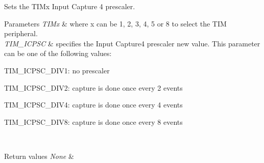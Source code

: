 Sets the T\+I\+Mx Input Capture 4 prescaler. 


\begin{DoxyParams}{Parameters}
{\em T\+I\+Mx} & where x can be 1, 2, 3, 4, 5 or 8 to select the T\+IM peripheral. \\
\hline
{\em T\+I\+M\+\_\+\+I\+C\+P\+SC} & specifies the Input Capture4 prescaler new value. This parameter can be one of the following values\+: \begin{DoxyItemize}
\item T\+I\+M\+\_\+\+I\+C\+P\+S\+C\+\_\+\+D\+I\+V1\+: no prescaler \item T\+I\+M\+\_\+\+I\+C\+P\+S\+C\+\_\+\+D\+I\+V2\+: capture is done once every 2 events \item T\+I\+M\+\_\+\+I\+C\+P\+S\+C\+\_\+\+D\+I\+V4\+: capture is done once every 4 events \item T\+I\+M\+\_\+\+I\+C\+P\+S\+C\+\_\+\+D\+I\+V8\+: capture is done once every 8 events \end{DoxyItemize}
\\
\hline
\end{DoxyParams}

\begin{DoxyRetVals}{Return values}
{\em None} & \\
\hline
\end{DoxyRetVals}
